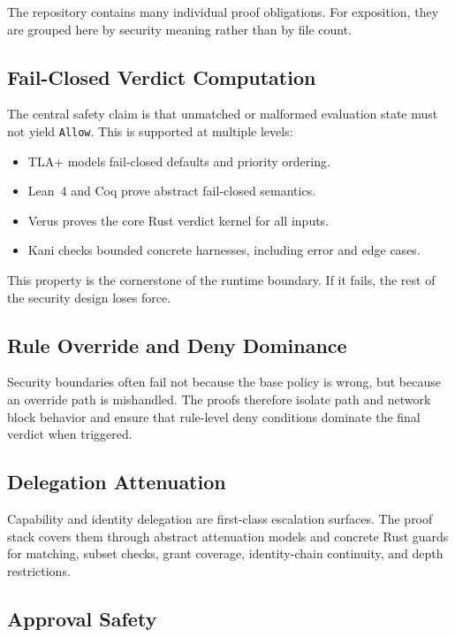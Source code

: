 \documentclass[11pt]{article}
\begin{document}
The repository contains many individual proof obligations. For exposition, they
are grouped here by security meaning rather than by file count.

\subsection{Fail-Closed Verdict Computation}

The central safety claim is that unmatched or malformed evaluation state must
not yield \texttt{Allow}. This is supported at multiple levels:

\begin{itemize}[leftmargin=*]
\item TLA+ models fail-closed defaults and priority ordering.
\item Lean~4 and Coq prove abstract fail-closed semantics.
\item Verus proves the core Rust verdict kernel for all inputs.
\item Kani checks bounded concrete harnesses, including error and edge cases.
\end{itemize}

This property is the cornerstone of the runtime boundary. If it fails, the rest
of the security design loses force.

\subsection{Rule Override and Deny Dominance}

Security boundaries often fail not because the base policy is wrong, but
because an override path is mishandled. The proofs therefore isolate path and
network block behavior and ensure that rule-level deny conditions dominate the
final verdict when triggered.

\subsection{Delegation Attenuation}

Capability and identity delegation are first-class escalation surfaces. The
proof stack covers them through abstract attenuation models and concrete Rust
guards for matching, subset checks, grant coverage, identity-chain continuity,
and depth restrictions.

\subsection{Approval Safety}
\end{document}
